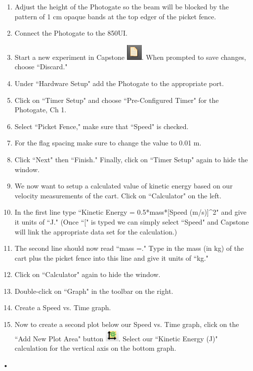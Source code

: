 \documentclass[main.tex]{subfiles}
\begin{document}
\begin{enumerate}
\item
Adjust the height of the Photogate so the beam will be blocked by the pattern of 1 cm opaque bands at the top edger of the picket fence.
\item
Connect the Photogate to the 850UI.
\item
Start a new experiment in Capstone \includegraphics{New_Experiment}. When prompted to save changes, choose ``Discard." 
\item
Under ``Hardware Setup" add the Photogate to the appropriate port.
\item
Click on ``Timer Setup" and choose ``Pre-Configured Timer" for the Photogate, Ch 1. 
\item	
Select ``Picket Fence," make sure that ``Speed" is checked.
\item
For the flag spacing make sure to change the value to 0.01 m.
\item
Click ``Next" then ``Finish." Finally, click on ``Timer Setup" again to hide the window.
\item
We now want to setup a calculated value of kinetic energy based on our velocity measurements of the cart. Click on ``Calculator" on the left.
\item
In the first line type ``Kinetic Energy = 0.5*mass*[Speed (m/s)]\^{}2" and give it units of ``J." (Once ``[" is typed we can simply select ``Speed" and Capstone will link the appropriate data set for the calculation.)
\item
The second line should now read ``mass =." Type in the mass (in kg) of the cart plus the picket fence into this line and give it units of ``kg."
\item
Click on ``Calculator" again to hide the window.
\item
Double-click on ``Graph" in the toolbar on the right.
\item
Create a Speed vs. Time graph.
\item
Now to create a second plot below our Speed vs. Time graph, click on the ``Add New Plot Area" button \includegraphics{Add_New_Plot}. Select our ``Kinetic Energy (J)" calculation for the vertical axis on the bottom graph.
\end{enumerate}•
\end{document}

